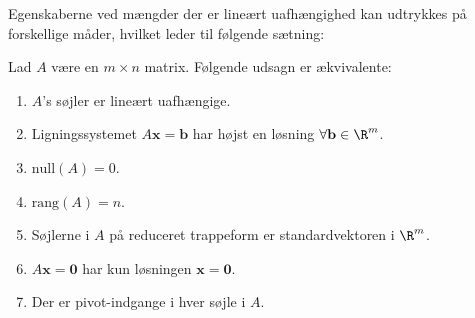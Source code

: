 %
%
Egenskaberne ved mængder der er lineært uafhængighed kan udtrykkes på forskellige måder, hvilket leder til følgende sætning:
%
%
\begin{thm}{}{}
%
Lad $A$ være en $m \times n$ matrix.
Følgende udsagn er ækvivalente:
%
\begin{enumerate}[label=(\alph*)]
\item $A$'s søjler er lineært uafhængige. 
\item Ligningssystemet $A\mathbf{x}=\mathbf{b}$ har højst en løsning $\forall \mathbf{b} \in \R^m$.
\item $\text{null}(A)=0$.
\item $\text{rang}(A)=n$.
\item Søjlerne i $A$ på reduceret trappeform er standardvektoren i $\R^m$.
\item $A\mathbf{x}=\mathbf{0}$ har kun løsningen $\mathbf{x}=\mathbf{0}$.                                                                                                                                                                                                                                                                                                                         
\item Der er pivot-indgange i hver søjle i $A$. 
\end{enumerate}
%
\end{thm}
%
%
